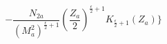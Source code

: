 \begin{equation}
-\frac{N_{2a}}{(M^{2}_{a})^{\frac{\epsilon}{2}+1}}
\left(\frac{Z_{a}}{2}\right)^{\frac{\epsilon}{2}+1}K_{\frac{\epsilon}{2}+1}(Z_{a})\biggr\}
\end{equation}

